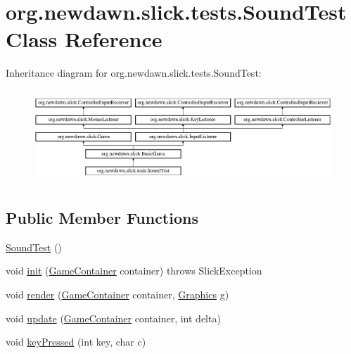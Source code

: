 \hypertarget{classorg_1_1newdawn_1_1slick_1_1tests_1_1_sound_test}{}\section{org.\+newdawn.\+slick.\+tests.\+Sound\+Test Class Reference}
\label{classorg_1_1newdawn_1_1slick_1_1tests_1_1_sound_test}
Inheritance diagram for org.\+newdawn.\+slick.\+tests.\+Sound\+Test\+:\begin{figure}[H]
\begin{center}
\leavevmode
\includegraphics[height=3.522012cm]{classorg_1_1newdawn_1_1slick_1_1tests_1_1_sound_test}
\end{center}
\end{figure}
\subsection*{Public Member Functions}
\begin{DoxyCompactItemize}
\item 
\mbox{\hyperlink{classorg_1_1newdawn_1_1slick_1_1tests_1_1_sound_test_a6eb15c813a7fdcc4560146923906e87a}{Sound\+Test}} ()
\item 
void \mbox{\hyperlink{classorg_1_1newdawn_1_1slick_1_1tests_1_1_sound_test_a1c3bcb76975206d231ff76edb95a1a12}{init}} (\mbox{\hyperlink{classorg_1_1newdawn_1_1slick_1_1_game_container}{Game\+Container}} container)  throws Slick\+Exception 
\item 
void \mbox{\hyperlink{classorg_1_1newdawn_1_1slick_1_1tests_1_1_sound_test_a03f1bed74a67b67de72d4ad040dee2b9}{render}} (\mbox{\hyperlink{classorg_1_1newdawn_1_1slick_1_1_game_container}{Game\+Container}} container, \mbox{\hyperlink{classorg_1_1newdawn_1_1slick_1_1_graphics}{Graphics}} g)
\item 
void \mbox{\hyperlink{classorg_1_1newdawn_1_1slick_1_1tests_1_1_sound_test_ac13bb1323d6ff26e218bfff39e1af1d1}{update}} (\mbox{\hyperlink{classorg_1_1newdawn_1_1slick_1_1_game_container}{Game\+Container}} container, int delta)
\item 
void \mbox{\hyperlink{classorg_1_1newdawn_1_1slick_1_1tests_1_1_sound_test_a6481970a877cc7fe5b46a06fb6dbdda2}{key\+Pressed}} (int key, char c)
\end{DoxyCompactItemize}
